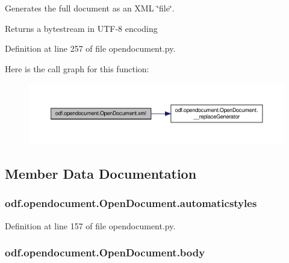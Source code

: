 Generates the full document as an X\+M\+L \char`\"{}file\char`\"{}. 

\begin{DoxyReturn}{Returns}
a bytestream in U\+T\+F-\/8 encoding 
\end{DoxyReturn}


Definition at line 257 of file opendocument.\+py.



Here is the call graph for this function\+:
\nopagebreak
\begin{figure}[H]
\begin{center}
\leavevmode
\includegraphics[width=350pt]{classodf_1_1opendocument_1_1OpenDocument_a88f8f4399b1364970b449e27b9e12638_cgraph}
\end{center}
\end{figure}




\subsection{Member Data Documentation}
\hypertarget{classodf_1_1opendocument_1_1OpenDocument_a7c3bf1a7904a57be3863ffa6683fa4a1}{
\subsubsection[{automaticstyles}]{\setlength{\rightskip}{0pt plus 5cm}odf.\+opendocument.\+Open\+Document.\+automaticstyles}}\label{classodf_1_1opendocument_1_1OpenDocument_a7c3bf1a7904a57be3863ffa6683fa4a1}


Definition at line 157 of file opendocument.\+py.

\hypertarget{classodf_1_1opendocument_1_1OpenDocument_a47cb65b29dfaaf3697c02cb166fbdab3}{
\subsubsection[{body}]{\setlength{\rightskip}{0pt plus 5cm}odf.\+opendocument.\+Open\+Document.\+body}}\label{classodf_1_1opendocument_1_1OpenDocument_a47cb65b29dfaaf3697c02cb166fbdab3}


